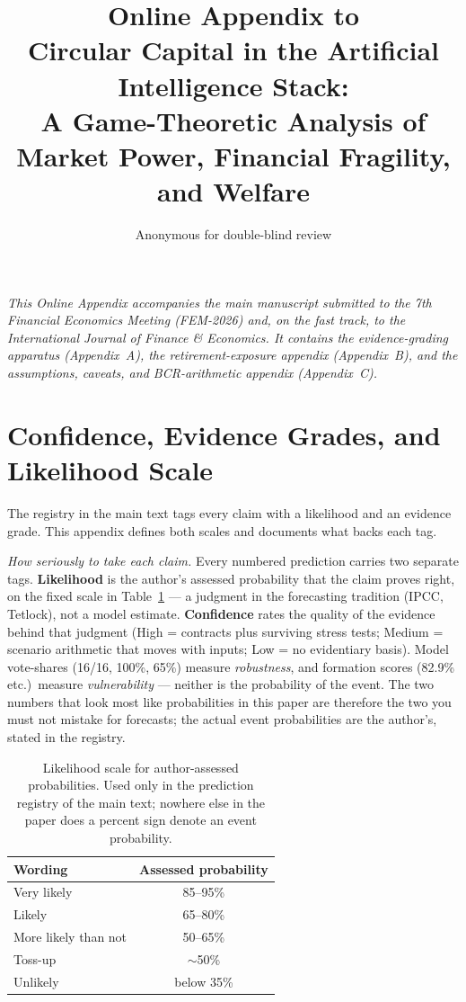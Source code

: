 \documentclass[11pt,a4paper]{article}
\title{Online Appendix to\\ Circular Capital in the Artificial Intelligence Stack:\\ A Game-Theoretic Analysis of Market Power, Financial Fragility, and Welfare}
\author{Anonymous for double-blind review}
\date{}
\begin{document}
\maketitle
\noindent\textit{This Online Appendix accompanies the main manuscript submitted to the 7th Financial Economics Meeting (FEM-2026) and, on the fast track, to the International Journal of Finance \& Economics. It contains the evidence-grading apparatus (Appendix~A), the retirement-exposure appendix (Appendix~B), and the assumptions, caveats, and BCR-arithmetic appendix (Appendix~C).}

\appendix
\section{Confidence, Evidence Grades, and Likelihood Scale}\label{sec:appendix-confidence}
The registry in the main text tags every claim with a likelihood and an evidence grade. This appendix defines both scales and documents what backs each tag.

\emph{How seriously to take each claim.} Every numbered prediction carries two separate tags. \textbf{Likelihood} is the author's assessed
probability that the claim proves right, on the fixed scale in
Table~\ref{tab:likelihood-scale-appendix} --- a judgment in the forecasting tradition
(IPCC, Tetlock), not a model estimate. \textbf{Confidence} rates the quality
of the evidence behind that judgment (High = contracts plus surviving stress
tests; Medium = scenario arithmetic that moves with inputs; Low = no
evidentiary basis). Model vote-shares (16/16, 100\%, 65\%) measure
\emph{robustness}, and formation scores (82.9\% etc.)\ measure
\emph{vulnerability} --- neither is the probability of the event. The two
numbers that look most like probabilities in this paper are therefore the
two you must not mistake for forecasts; the actual event probabilities are
the author's, stated in the registry.

\begin{table}[htbp]
\centering
\caption{Likelihood scale for author-assessed probabilities. Used only in the prediction registry of the main text; nowhere else in the paper does a percent sign denote an event probability.}
\label{tab:likelihood-scale-appendix}
\begin{tabular}{lc}
\toprule
Wording & Assessed probability \\
\midrule
Very likely & 85--95\% \\
Likely & 65--80\% \\
More likely than not & 50--65\% \\
Toss-up & $\sim$50\% \\
Unlikely & below 35\% \\
\bottomrule
\end{tabular}
\end{table}
\end{document}
